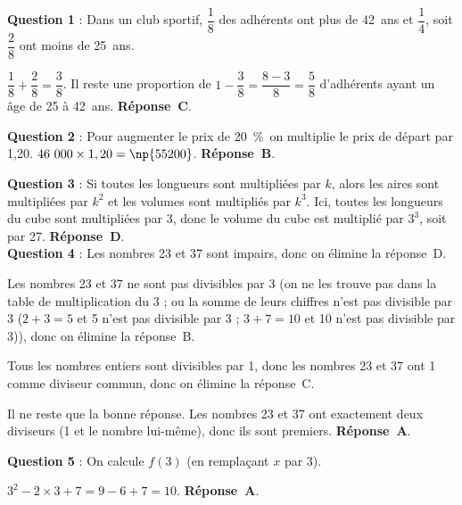 
\medskip

\textbf{Question 1} : Dans un club sportif, $\dfrac{1}{8}$ des adhérents ont plus de 42~ans et $\dfrac{1}{4}$, soit $\dfrac{2}{8}$ ont moins de 25~ans.

$\dfrac{1}{8}+\dfrac{2}{8}=\dfrac{3}{8}$. Il reste une proportion de $1 - \dfrac{3}{8} = \dfrac{8 - 3}{8} = \dfrac{5}{8}$ d'adhérents ayant un âge de 25 à  42~ans. \textbf{Réponse~C}.

\textbf{Question 2} : Pour augmenter le prix de 20~\%\, on multiplie le prix de départ par 1,20. $46~000\times 1,20=\np{55200}$. \textbf{Réponse~B}.

\textbf{Question 3} : Si toutes les longueurs sont multipliées par $k$, alors les aires sont multipliées par $k^2$ et les volumes sont multipliés par $k^3$. Ici, toutes les longueurs du cube sont multipliées par 3, donc le volume du cube est multiplié par $3^3$, soit par 27.  \textbf{Réponse~D}. \\[2mm]
\textbf{Question 4} : Les nombres 23 et 37 sont impairs, donc on élimine la réponse~D.

Les nombres 23 et 37 ne sont pas divisibles par 3 (on ne les trouve pas dans la table de multiplication du 3 ; ou la somme de leurs chiffres n’est pas divisible par 3 ($2+3=5$ et 5 n’est pas divisible par 3 ; $3+7 = 10$ et 10 n’est pas divisible par 3)), donc on élimine la réponse~B.

Tous les nombres entiers sont divisibles par 1, donc les nombres 23 et 37 ont 1 comme diviseur commun, donc on élimine la réponse~C.

Il ne reste que la bonne réponse. Les nombres 23 et 37 ont exactement deux diviseurs (1 et le nombre lui-même), donc ils sont premiers. \textbf{Réponse~A}.

\textbf{Question 5} : On calcule $f(3)$ (en remplaçant $x$ par 3). 

$3^2 - 2\times 3+7 = 9 - 6 + 7 =  10$. \quad  \textbf{Réponse~A}. 

\vspace{0.5cm}

